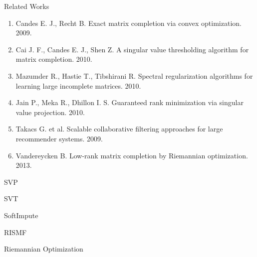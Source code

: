 \documentclass{beamer}
\begin{document}
\begin{frame}{Related Works}
	\begin{enumerate}
		\item Candes E. J., Recht B. Exact matrix completion via convex optimization. 2009.
		\item Cai J. F., Candes E. J., Shen Z. A singular value thresholding algorithm for matrix completion. 2010.
		\item Mazumder R., Hastie T., Tibshirani R. Spectral regularization algorithms for learning large incomplete matrices. 2010.
		\item Jain P., Meka R., Dhillon I. S. Guaranteed rank minimization via singular value projection. 2010.
		\item Takacs G. et al. Scalable collaborative filtering approaches for large recommender systems. 2009.
		\item Vandereycken B. Low-rank matrix completion by Riemannian optimization. 2013.
	\end{enumerate}
\end{frame}%
\begin{frame}{SVP}
\end{frame}
\begin{frame}{SVT}
\end{frame}
\begin{frame}{SoftImpute}
\end{frame}
\begin{frame}{RISMF}
\end{frame}
\begin{frame}{Riemannian Optimization}
\end{frame}
\end{document}
